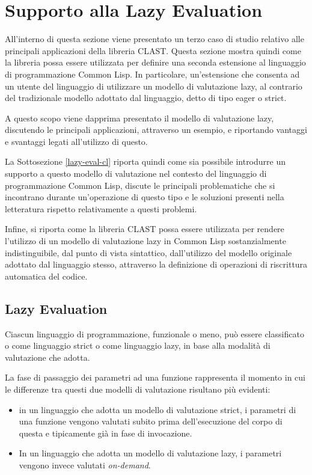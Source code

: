 \section{Supporto alla Lazy Evaluation}
\label{lazy-evaluation}

All'interno di questa sezione viene presentato un terzo caso di studio relativo
alle principali applicazioni della libreria CLAST. Questa sezione mostra quindi
come la libreria possa essere utilizzata per definire una seconda estensione al
linguaggio di programmazione Common Lisp. In particolare, un'estensione che
consenta ad un utente del linguaggio di utilizzare un modello di valutazione
lazy, al contrario del tradizionale modello adottato dal linguaggio, detto di
tipo eager o strict.

A questo scopo viene dapprima presentato il modello di valutazione lazy,
discutendo le principali applicazioni, attraverso un esempio, e riportando
vantaggi e svantaggi legati all'utilizzo di questo.

La Sottosezione \ref{lazy-eval-cl} riporta quindi come sia possibile introdurre
un supporto a questo modello di valutazione nel contesto del linguaggio di
programmazione Common Lisp, discute le principali problematiche che si
incontrano durante un'operazione di questo tipo e le soluzioni presenti nella
letteratura rispetto relativamente a questi problemi.

Infine, si riporta come la libreria CLAST possa essere utilizzata per rendere
l'utilizzo di un modello di valutazione lazy in Common Lisp sostanzialmente
indistinguibile, dal punto di vista sintattico, dall'utilizzo del modello
originale adottato dal linguaggio stesso, attraverso la definizione di
operazioni di riscrittura automatica del codice.

\subsection{Lazy Evaluation}

Ciascun linguaggio di programmazione, funzionale o meno, può essere classificato
o come linguaggio strict o come linguaggio lazy, in base alla modalità di
valutazione che adotta.

La fase di passaggio dei parametri ad una funzione rappresenta il momento in cui
le differenze tra questi due modelli di valutazione risultano più evidenti:

\begin{itemize}

\item in un linguaggio che adotta un modello di valutazione strict, i parametri
di una funzione vengono valutati subito prima dell'esecuzione del corpo di
questa e tipicamente già in fase di invocazione.

\item In un linguaggio che adotta un modello di valutazione lazy, i parametri
vengono invece valutati \textit{on-demand}.

\end{itemize}

